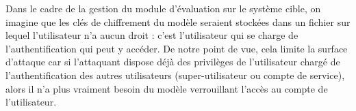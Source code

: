 Dans le cadre de la gestion du module d'évaluation sur le système cible, on imagine que les clés de chiffrement du modèle seraient stockées dans un fichier sur lequel l'utilisateur n'a aucun droit : c'est l'utilisateur qui se charge de l'authentification qui peut y accéder. De notre point de vue, cela limite la surface d'attaque car si l'attaquant dispose déjà des privilèges de l'utilisateur chargé de l'authentification des autres utilisateurs (super-utilisateur ou compte de service), alors il n'a plus vraiment besoin du modèle verrouillant l'accès au compte de l'utilisateur.